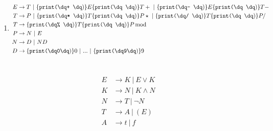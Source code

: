 \documentclass[a4paper,10pt]{scrartcl}
\begin{document}
\begin{enumerate}
\begin{center}
{{                    
                }
                \Tr{$-$}
            }
        \end{center}
 \item  \begin{align*}
         E &\to T\ |\ \print{+ } E \print{ } T +\ |\  \print{- } E \print{ } T -\\
         T &\to P\ |\ \print{* }T \print{ } P \star\ |\ \print{/ }T \print{ } P /\\
         T &\to \print{\% }T \print{ } P \operatorname{mod}\\
         P &\to N\ |\ E \\
         N &\to D\ |\ ND \\
         D &\to \print{0}0\ |\ ...\ |\ \print{9}9 \\
        \end{align*}
\end{enumerate}

\section{}
\begin{align*}
    E &\to K\ |\ E \lor K \\
    K &\to N\ |\ K \land N \\
    N &\to T\ |\ \neg N\\
    T &\to A\ |\ (E)\\
    A &\to t\ |\ f
\end{align*}\pagebreak
\end{document}
